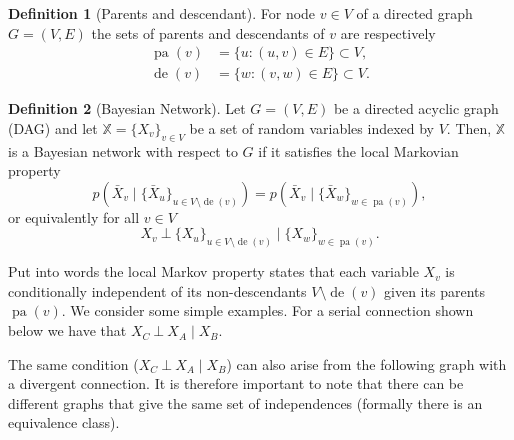 \documentclass[a4paper]{article}
\newcommand{\given}{\mid}
\newcommand{\ind}{~\bot~} %
\DeclareMathOperator{\pa}{pa} %
\DeclareMathOperator{\de}{de} %
\theoremstyle{plain}
\theoremstyle{definition}
\newtheorem{defn}{Definition}[section]
\theoremstyle{remark}
\begin{document}
\begin{defn}[Parents and descendant]
  For node $v \in V$ of a directed graph $G = (V, E)$ the sets of parents and
  descendants of $v$ are respectively
  \begin{align*}
    \pa(v) &= \{u : (u,v) \in E\} \subset V, \\
    \de(v) &= \{w : (v,w) \in E\} \subset V.
  \end{align*}
\end{defn}

\begin{defn}[Bayesian Network]
  Let $G = (V,E)$ be a directed acyclic graph (DAG) and let $\mathbb{X} =
  \{X_v\}_{v \in V}$ be a set of random variables indexed by $V$. Then,
  $\mathbb{X}$ is a Bayesian network with respect to $G$ if it satisfies the
  local Markovian property
  \[
    p(\bar{X}_v \given \{\bar{X}_u\}_{u \in V \setminus \de(v)})
    = p(\bar{X}_v \given \{\bar{X}_w\}_{w \in \pa(v)}),
  \]
  or equivalently for all $v \in V$
  \[
    X_v \ind \{X_u\}_{u \in V \setminus \de(v)} \given \{X_w\}_{w \in \pa(v)}.
  \]
\end{defn}
Put into words the local Markov property states that each variable $X_v$ is
conditionally independent of its non-descendants $V \setminus \de(v)$ given its
parents $\pa(v)$. We consider some simple examples. For a serial connection
shown below we have that $X_C \ind X_A \given X_B$.

\begin{center}
\end{center}

The same condition ($X_C \ind X_A \given X_B$) can also arise from the
following graph with a divergent connection. It is therefore important to note
that there can be different graphs that give the same set of independences
(formally there is an equivalence class).

\begin{center}
\end{center}
\end{document}
